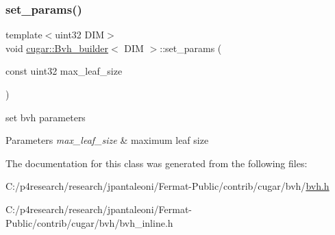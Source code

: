 \subsubsection{\texorpdfstring{set\+\_\+params()}{set\_params()}}
{\footnotesize\ttfamily template$<$uint32 D\+IM$>$ \\
void \hyperlink{classcugar_1_1_bvh__builder}{cugar\+::\+Bvh\+\_\+builder}$<$ D\+IM $>$\+::set\+\_\+params (\begin{DoxyParamCaption}\item[{const uint32}]{max\+\_\+leaf\+\_\+size }\end{DoxyParamCaption})\hspace{0.3cm}{\ttfamily [inline]}}

set bvh parameters


\begin{DoxyParams}{Parameters}
{\em max\+\_\+leaf\+\_\+size} & maximum leaf size \\
\hline
\end{DoxyParams}


The documentation for this class was generated from the following files\+:\begin{DoxyCompactItemize}
\item 
C\+:/p4research/research/jpantaleoni/\+Fermat-\/\+Public/contrib/cugar/bvh/\hyperlink{bvh_8h}{bvh.\+h}\item 
C\+:/p4research/research/jpantaleoni/\+Fermat-\/\+Public/contrib/cugar/bvh/bvh\+\_\+inline.\+h\end{DoxyCompactItemize}
